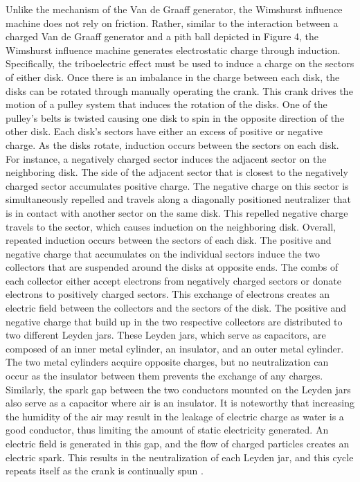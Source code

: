 \documentclass[oneside,12pt]{amsart}
\begin{document}
\indent Unlike the mechanism of the Van de Graaff generator, the Wimshurst influence machine does not rely on friction. Rather, similar to the interaction between a charged Van de Graaff generator and a pith ball depicted in Figure 4, the Wimshurst influence machine generates electrostatic charge through induction. Specifically, the triboelectric effect must be used to induce a charge on the sectors of either disk. Once there is an imbalance in the charge between each disk, the disks can be rotated through manually operating the crank. This crank drives the motion of a pulley system that induces the rotation of the disks. One of the pulley’s belts is twisted causing one disk to spin in the opposite direction of the other disk. Each disk’s sectors have either an excess of positive or negative charge. As the disks rotate, induction occurs between the sectors on each disk. For instance, a negatively charged sector induces the adjacent sector on the neighboring disk. The side of the adjacent sector that is closest to the negatively charged sector accumulates positive charge. The negative charge on this sector is simultaneously repelled and travels along a diagonally positioned neutralizer that is in contact with another sector on the same disk. This repelled negative charge travels to the sector, which causes induction on the neighboring disk. Overall, repeated induction occurs between the sectors of each disk. The positive and negative charge that accumulates on the individual sectors induce the two collectors that are suspended around the disks at opposite ends. The combs of each collector either accept electrons from negatively charged sectors or donate electrons to positively charged sectors. This exchange of electrons creates an electric field between the collectors and the sectors of the disk. The positive and negative charge that build up in the two respective collectors are distributed to two different Leyden jars. These Leyden jars, which serve as capacitors, are composed of an inner metal cylinder, an insulator, and an outer metal cylinder. The two metal cylinders acquire opposite charges, but no neutralization can occur as the insulator between them prevents the exchange of any charges. Similarly, the spark gap between the two conductors mounted on the Leyden jars also serve as a capacitor where air is an insulator. It is noteworthy that increasing the humidity of the air may result in the leakage of electric charge as water is a good conductor, thus limiting the amount of static electricity generated. An electric field is generated in this gap, and the flow of charged particles creates an electric spark. This results in the neutralization of each Leyden jar, and this cycle repeats itself as the crank is continually spun \cite{rim}. \\
\end{document}
